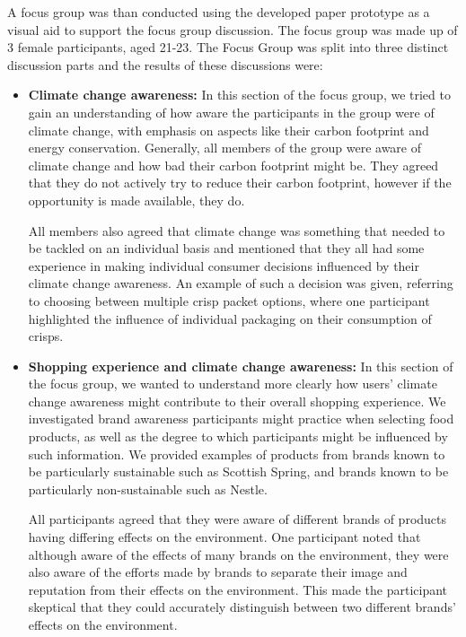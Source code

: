 \documentclass[a4,10pt,twocolumn]{article}
\begin{document}
A focus group was than conducted using the developed paper prototype as a visual aid to support the focus group discussion. The focus group was made up of 3 female participants, aged 21-23. The Focus Group was split into three distinct discussion parts and the results of these discussions were:
\begin{itemize}
    \item \textbf{Climate change awareness:} In this section of the focus group, we tried to gain an understanding of how aware the participants in the group were of climate change, with emphasis on aspects like their carbon footprint and energy conservation. Generally, all members of the group were aware of climate change and how bad their carbon footprint might be. They agreed that they do not actively try to reduce their carbon footprint, however if the opportunity is made available, they do. 

    \par All members also agreed that climate change was something that needed to be tackled on an individual basis and mentioned that they all had some experience in making individual consumer decisions influenced by their climate change awareness. An example of such a decision was given, referring to choosing between multiple crisp packet options, where one participant highlighted the influence of individual packaging on their consumption of crisps. 

    \item \textbf{Shopping experience and climate change awareness:} In this section of the focus group, we wanted to understand more clearly how users' climate change awareness might contribute to their overall shopping experience. We investigated brand awareness participants might practice when selecting food products, as well as the degree to which participants might be influenced by such information. We provided examples of products from brands known to be particularly sustainable such as Scottish Spring, and brands known to be particularly non-sustainable such as Nestle.

    \par All participants agreed that they were aware of different brands of products having differing effects on the environment. One participant noted that although aware of the effects of many brands on the environment, they were also aware of the efforts made by brands to separate their image and reputation from their effects on the environment. This made the participant skeptical that they could accurately distinguish between two different brands' effects on the environment. 


\end{itemize}
\end{document}
